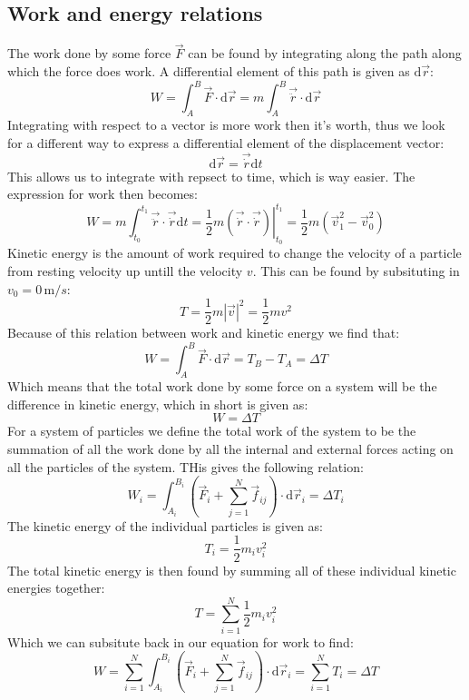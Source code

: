\documentclass[11pt, a4paper]{article}
\newcommand*{\m}{\text{m}}
\renewcommand*{\d}{\text{d}}
\numberwithin{equation}{section}
\numberwithin{figure}{section}
\begin{document}
\subsection{Work and energy relations}
The work done by some force $\vec{F}$ can be found by integrating along the path along which the force does work. A differential element of this path is given as $\d\vec{r}$:
\begin{equation}
  W = \int_A^B \vec{F}\cdot\d\vec{r} = m\int_A^B \vec{\ddot{r}}\cdot \d\vec{r}
\end{equation}
Integrating with respect to a vector is more work then it's worth, thus we look for a different way to express a differential element of the displacement vector:
\begin{equation}
  \d\vec{r} = \vec{\dot{r}}\d t
\end{equation}
This allows us to integrate with repsect to time, which is way easier. The expression for work then becomes:
\begin{equation}
  W = m\int_{t_0}^{t_1} \vec{\ddot{r}}\cdot \vec{\dot{r}} \d t = \left.\frac{1}{2}m(\vec{\dot{r}} \cdot \vec{\dot{r}})\right|_{t_0}^{t_1} = \frac{1}{2}m(\vec{v}_1^2 - \vec{v}_0^2)
\end{equation}
Kinetic energy is the amount of work required to change the velocity of a particle from resting velocity up untill the velocity $v$. This can be found by subsituting in $v_0 = 0\,\m/s$:
\begin{equation}
  T = \frac{1}{2}m|\vec{v}|^2 = \frac{1}{2}mv^2
\end{equation}
Because of this relation between work and kinetic energy we find that:
\begin{equation}
  W = \int_A^B \vec{F}\cdot \d\vec{r} = T_B - T_A = \Delta T
\end{equation}
Which means that the total work done by some force on a system will be the difference in kinetic energy, which in short is given as:
\begin{equation}
  W = \Delta T
\end{equation}
For a system of particles we define the total work of the system to be the summation of all the work done by all the internal and external forces acting on all the particles of the system. THis gives the following relation:
\begin{equation}
  W_i = \int_{A_i}^{B_i}\left( \vec{F}_i + \sum_{j=1}^{N}\vec{f}_{ij} \right) \cdot \d\vec{r}_i = \Delta T_i
\end{equation}
The kinetic energy of the individual particles is given as:
\begin{equation}
  T_i = \frac{1}{2}m_iv_i^2
\end{equation}
The total kinetic energy is then found by summing all of these individual kinetic energies together:
\begin{equation}
  T = \sum_{i=1}^{N} \frac{1}{2}m_iv_i^2
\end{equation}
Which we can subsitute back in our equation for work to find:
\begin{equation}
  W = \sum_{i=1}^{N} \int_{A_i}^{B_i}\left( \vec{F}_i + \sum_{j=1}^{N}\vec{f}_{ij} \right) \cdot \d\vec{r}_i = \sum_{i=1}^{N} T_i = \Delta T
\end{equation}
\end{document}
